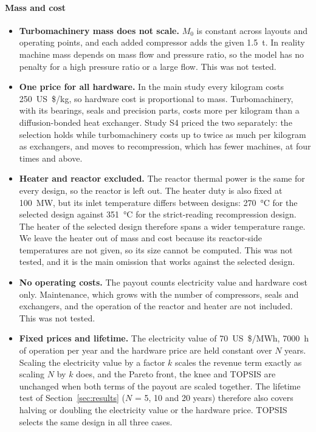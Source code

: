 \paragraph{Mass and cost}
\begin{itemize}
  \item \textbf{Turbomachinery mass does not scale.} $M_0$ is constant across layouts and operating points, and each added compressor adds the given \SI{1.5}{t}. In reality machine mass depends on mass flow and pressure ratio, so the model has no penalty for a high pressure ratio or a large flow. This was not tested.
  \item \textbf{One price for all hardware.} In the main study every kilogram costs \SI{250}{US\$/kg}, so hardware cost is proportional to mass. Turbomachinery, with its bearings, seals and precision parts, costs more per kilogram than a diffusion-bonded heat exchanger. Study S4 priced the two separately: the selection holds while turbomachinery costs up to twice as much per kilogram as exchangers, and moves to recompression, which has fewer machines, at four times and above.
  \item \textbf{Heater and reactor excluded.} The reactor thermal power is the same for every design, so the reactor is left out. The heater duty is also fixed at \SI{100}{MW}, but its \cotwo{} inlet temperature differs between designs: \SI{270}{\celsius} for the selected design against \SI{351}{\celsius} for the strict-reading recompression design. The heater of the selected design therefore spans a wider temperature range. We leave the heater out of mass and cost because its reactor-side temperatures are not given, so its size cannot be computed. This was not tested, and it is the main omission that works against the selected design.
  \item \textbf{No operating costs.} The payout counts electricity value and hardware cost only. Maintenance, which grows with the number of compressors, seals and exchangers, and the operation of the reactor and heater are not included. This was not tested.
  \item \textbf{Fixed prices and lifetime.} The electricity value of \SI{70}{US\$/MWh}, \SI{7000}{h} of operation per year and the hardware price are held constant over $N$ years. Scaling the electricity value by a factor $k$ scales the revenue term exactly as scaling $N$ by $k$ does, and the Pareto front, the knee and TOPSIS are unchanged when both terms of the payout are scaled together. The lifetime test of Section~\ref{sec:results} ($N$ = 5, 10 and 20 years) therefore also covers halving or doubling the electricity value or the hardware price. TOPSIS selects the same design in all three cases.

\end{itemize}
